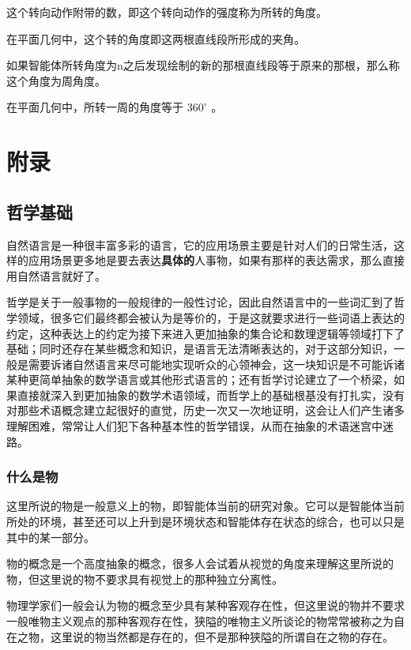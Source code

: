 \documentclass[12pt,oneside]{book}
\begin{document}
这个转向动作附带的数，即这个转向动作的强度称为所转的角度。

在平面几何中，这个转的角度即这两根直线段所形成的夹角。

如果智能体所转角度为n之后发现绘制的新的那根直线段等于原来的那根，那么称这个角度为周角度。

在平面几何中，所转一周的角度等于 $360^{\circ}$ 。




\appendix

\part{附录}
\chapter{哲学基础}
自然语言是一种很丰富多彩的语言，它的应用场景主要是针对人们的日常生活，这样的应用场景更多地是要去表达\textbf{具体的}人事物，如果有那样的表达需求，那么直接用自然语言就好了。

哲学是关于一般事物的一般规律的一般性讨论，因此自然语言中的一些词汇到了哲学领域，很多它们最终都会被认为是等价的，于是这就要求进行一些词语上表达的约定，这种表达上的约定为接下来进入更加抽象的集合论和数理逻辑等领域打下了基础；同时还存在某些概念和知识，是语言无法清晰表达的，对于这部分知识，一般是需要诉诸自然语言来尽可能地实现听众的心领神会，这一块知识是不可能诉诸某种更简单抽象的数学语言或其他形式语言的；还有哲学讨论建立了一个桥梁，如果直接就深入到更加抽象的数学术语领域，而哲学上的基础根基没有打扎实，没有对那些术语概念建立起很好的直觉，历史一次又一次地证明，这会让人们产生诸多理解困难，常常让人们犯下各种基本性的哲学错误，从而在抽象的术语迷宫中迷路。



\section{什么是物}
这里所说的物是一般意义上的物，即智能体当前的研究对象。它可以是智能体当前所处的环境，甚至还可以上升到是环境状态和智能体存在状态的综合，也可以只是其中的某一部分。

物的概念是一个高度抽象的概念，很多人会试着从视觉的角度来理解这里所说的物，但这里说的物不要求具有视觉上的那种独立分离性。

物理学家们一般会认为物的概念至少具有某种客观存在性，但这里说的物并不要求一般唯物主义观点的那种客观存在性，狭隘的唯物主义所谈论的物常常被称之为自在之物，这里说的物当然都是存在的，但不是那种狭隘的所谓自在之物的存在。
\end{document}
